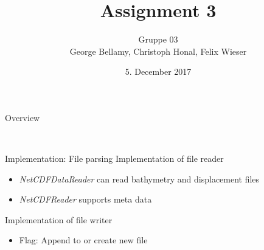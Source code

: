 \documentclass[shortpres]{beamer}
\title[{Tsunami simulation}]{Assignment 3}
\author[Bellamy, Honal, Wieser]{Gruppe 03\\George Bellamy, Christoph Honal, Felix Wieser\\\vspace{10pt}{\small Bachelorpraktikum}}
\institute[TU M\"unchen]{Technical University of Munich}
\date{5. December 2017}
\begin{document}
\maketitle

\begin{frame}{Overview}
	\begin{figure}
		\hspace{40pt}
		\hspace{0pt}\vspace{20pt}\\
	\end{figure}
\end{frame}

\begin{frame}{Implementation: File parsing}
	Implementation of file reader
	\begin{itemize}
		\item \textit{NetCDFDataReader} can read bathymetry and displacement files
		\item \textit{NetCDFReader} supports meta data
	\end{itemize}
	\vspace{20pt}
	Implementation of file writer
	\begin{itemize}
		\item Flag: Append to or create new file
	\end{itemize}
\end{frame}
\end{document}

